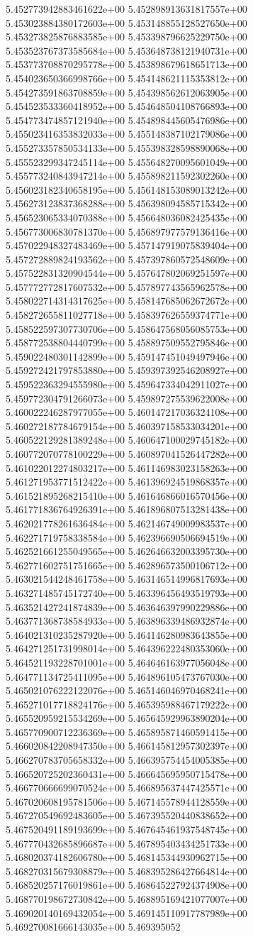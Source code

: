 5.452773942883461622e+00	5.452898913631817557e+00	5.453023884380172603e+00	5.453148855128527650e+00	5.453273825876883585e+00	5.453398796625229750e+00	5.453523767373585684e+00	5.453648738121940731e+00	5.453773708870295778e+00	5.453898679618651713e+00	5.454023650366998766e+00	5.454148621115353812e+00	5.454273591863708859e+00	5.454398562612063905e+00	5.454523533360418952e+00	5.454648504108766893e+00	5.454773474857121940e+00	5.454898445605476986e+00	5.455023416353832033e+00	5.455148387102179086e+00	5.455273357850534133e+00	5.455398328598890068e+00	5.455523299347245114e+00	5.455648270095601049e+00	5.455773240843947214e+00	5.455898211592302260e+00	5.456023182340658195e+00	5.456148153089013242e+00	5.456273123837368288e+00	5.456398094585715342e+00	5.456523065334070388e+00	5.456648036082425435e+00	5.456773006830781370e+00	5.456897977579136416e+00	5.457022948327483469e+00	5.457147919075839404e+00	5.457272889824193562e+00	5.457397860572548609e+00	5.457522831320904544e+00	5.457647802069251597e+00	5.457772772817607532e+00	5.457897743565962578e+00	5.458022714314317625e+00	5.458147685062672672e+00	5.458272655811027718e+00	5.458397626559374771e+00	5.458522597307730706e+00	5.458647568056085753e+00	5.458772538804440799e+00	5.458897509552795846e+00	5.459022480301142899e+00	5.459147451049497946e+00	5.459272421797853880e+00	5.459397392546208927e+00	5.459522363294555980e+00	5.459647334042911027e+00	5.459772304791266073e+00	5.459897275539622008e+00	5.460022246287977055e+00	5.460147217036324108e+00	5.460272187784679154e+00	5.460397158533034201e+00	5.460522129281389248e+00	5.460647100029745182e+00	5.460772070778100229e+00	5.460897041526447282e+00	5.461022012274803217e+00	5.461146983023158263e+00	5.461271953771512422e+00	5.461396924519868357e+00	5.461521895268215410e+00	5.461646866016570456e+00	5.461771836764926391e+00	5.461896807513281438e+00	5.462021778261636484e+00	5.462146749009983537e+00	5.462271719758338584e+00	5.462396690506694519e+00	5.462521661255049565e+00	5.462646632003395730e+00	5.462771602751751665e+00	5.462896573500106712e+00	5.463021544248461758e+00	5.463146514996817693e+00	5.463271485745172740e+00	5.463396456493519793e+00	5.463521427241874839e+00	5.463646397990229886e+00	5.463771368738584933e+00	5.463896339486932874e+00	5.464021310235287920e+00	5.464146280983643855e+00	5.464271251731998014e+00	5.464396222480353060e+00	5.464521193228701001e+00	5.464646163977056048e+00	5.464771134725411095e+00	5.464896105473767030e+00	5.465021076222122076e+00	5.465146046970468241e+00	5.465271017718824176e+00	5.465395988467179222e+00	5.465520959215534269e+00	5.465645929963890204e+00	5.465770900712236369e+00	5.465895871460591415e+00	5.466020842208947350e+00	5.466145812957302397e+00	5.466270783705658332e+00	5.466395754454005385e+00	5.466520725202360431e+00	5.466645695950715478e+00	5.466770666699070524e+00	5.466895637447425571e+00	5.467020608195781506e+00	5.467145578944128559e+00	5.467270549692483605e+00	5.467395520440838652e+00	5.467520491189193699e+00	5.467645461937548745e+00	5.467770432685896687e+00	5.467895403434251733e+00	5.468020374182606780e+00	5.468145344930962715e+00	5.468270315679308879e+00	5.468395286427664814e+00	5.468520257176019861e+00	5.468645227924374908e+00	5.468770198672730842e+00	5.468895169421077007e+00	5.469020140169432054e+00	5.469145110917787989e+00	5.469270081666143035e+00	5.469395052